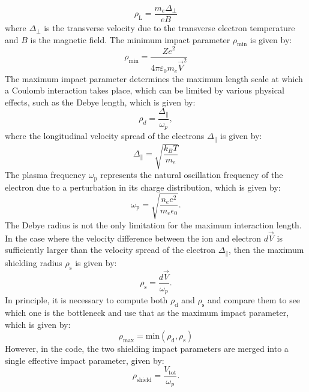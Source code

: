 %
\begin{equation}
\rho_{\text{L}} = \frac{m_e \Delta_{\perp}}{e B}
\label{eq: larmor_radius}
\end{equation}
%
where \(\Delta_{\perp}\) is the transverse velocity due to the transverse electron temperature and \(B\) is the magnetic field.
%
The minimum impact parameter \( \rho_{\text{min}} \) is given by:
\begin{equation}
\rho_{\text{min}} = \frac{Z e^2}{4 \pi \varepsilon_0 m_e \vec{V}^2}
\label{eq: minimum_impact_parameter}
\end{equation}
%
The maximum impact parameter determines the maximum length scale at which a Coulomb interaction takes place, which can be limited by various physical effects, such as the Debye length, which is given by:
%
\begin{equation}
    \rho_d = \frac{\Delta_{\parallel}}{\omega_p},
\end{equation}
%
where the longitudinal velocity spread of the electrons \( \Delta_{\parallel}  \) is given by:
%
\begin{equation}
   \Delta_{\parallel} = \sqrt{\frac{k_B T}{m_e}}
\end{equation}
%
The plasma frequency \( \omega_\text{p} \)  represents the natural oscillation frequency of the electron due to a perturbation in its charge distribution, which is given by:
%
\begin{equation}
\omega_\text{p} = \sqrt{\frac{n_e e^2}{m_e \epsilon_0}}.
\end{equation}
%
The Debye radius is not the only limitation for the maximum interaction length. In the case where the velocity difference between the ion and electron \( d\vec{V} \) is sufficiently larger than the velocity spread of the electron \( \Delta_{\parallel} \), then the maximum shielding radius \( \rho_\text{s} \) is given by:
%
\begin{equation}
    \rho_\text{s} = \frac{d\vec{V}}{\omega_p}.
\end{equation}
%
In principle, it is necessary to compute both \( \rho_\text{d} \) and \( \rho_\text{s} \) and compare them to see which one is the bottleneck and use that as the maximum impact parameter, which is given by:
%
\[
\rho_\text{max} = \text{min}(\rho_\text{d},\rho_\text{s})
\]
%
However, in the code, the two shielding impact parameters are merged into a single effective impact parameter, given by:
%
\begin{equation}
\rho_\text{shield} = \frac{V_{\text{tot}}}{\omega_p}.
\label{eq: rho_shield_combined}
\end{equation}
